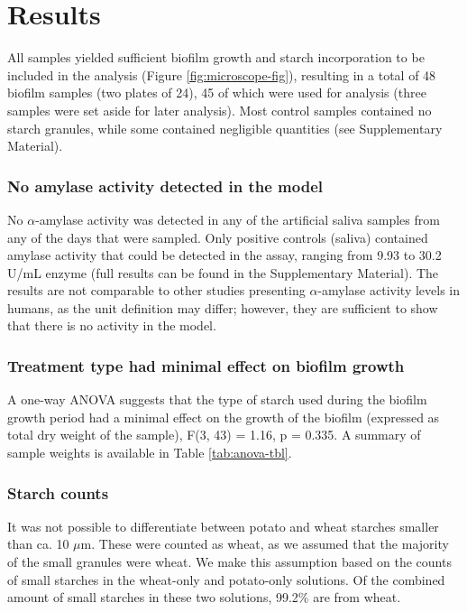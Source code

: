 \documentclass[utf8]{../templates/frontiersSCNS}
\begin{document}
\section{Results}\label{results}

All samples yielded sufficient biofilm growth and starch incorporation to be
included in the analysis (Figure \ref{fig:microscope-fig}), resulting in a total of 48 biofilm samples (two plates of 24),
45 of which were used for analysis (three samples were set aside for later
analysis).
Most control samples contained no starch granules, while some contained negligible
quantities (see Supplementary Material).

\subsubsection{No amylase activity detected in the model}\label{no-amylase-activity-detected-in-the-model}

No \(\alpha\)-amylase activity was detected in any of the artificial
saliva samples from any of the days that were sampled. Only positive controls
(saliva)
contained amylase activity that could be detected in the assay, ranging from
9.93 to 30.2 U/mL enzyme
(full results can be found in the Supplementary Material).
The results are not comparable to other studies presenting \(\alpha\)-amylase activity
levels in humans, as the unit definition may differ;
however, they are sufficient to show that there is no activity in the model.

\subsubsection{Treatment type had minimal effect on biofilm growth}\label{treatment-type-had-minimal-effect-on-biofilm-growth}

A one-way ANOVA suggests that the type of starch used during the biofilm
growth period had a minimal effect on the growth of the biofilm
(expressed as total dry weight of the sample), F(3, 43)
= 1.16, p = 0.335.
A summary of sample weights is available in Table \ref{tab:anova-tbl}.

\subsubsection{Starch counts}\label{starch-counts}

It was not possible to differentiate between potato and
wheat starches smaller than ca. 10 \(\mu\)m. These were counted as wheat,
as we assumed that the majority of the small granules were wheat. We make this
assumption based on the counts of small starches in the wheat-only and potato-only
solutions. Of the combined amount of small starches in these two solutions,
99.2\%
are from wheat.
\end{document}
